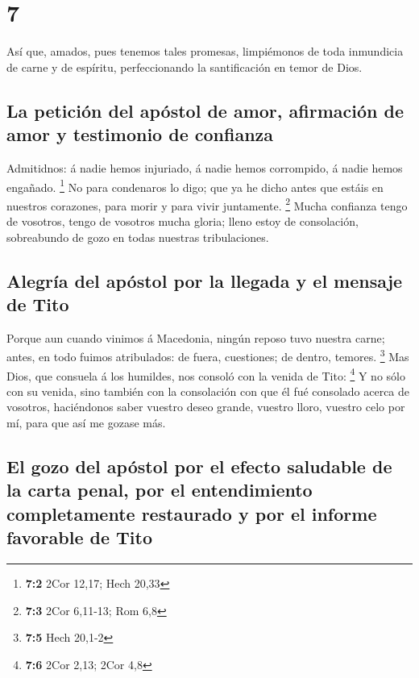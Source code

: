 \hypertarget{section-6}{%
\section{7}\label{section-6}}

 Así que, amados, pues tenemos tales promesas, limpiémonos
de toda inmundicia de carne y de espíritu, perfeccionando la
santificación en temor de Dios.

\hypertarget{la-peticiuxf3n-del-apuxf3stol-de-amor-afirmaciuxf3n-de-amor-y-testimonio-de-confianza}{%
\subsection{La petición del apóstol de amor, afirmación de amor y
testimonio de
confianza}\label{la-peticiuxf3n-del-apuxf3stol-de-amor-afirmaciuxf3n-de-amor-y-testimonio-de-confianza}}

 Admitidnos: á nadie hemos injuriado, á nadie hemos
corrompido, á nadie hemos engañado. \footnote{\textbf{7:2} 2Cor 12,17;
  Hech 20,33}  No para condenaros lo digo; que ya he dicho
antes que estáis en nuestros corazones, para morir y para vivir
juntamente. \footnote{\textbf{7:3} 2Cor 6,11-13; Rom 6,8} 
Mucha confianza tengo de vosotros, tengo de vosotros mucha gloria; lleno
estoy de consolación, sobreabundo de gozo en todas nuestras
tribulaciones.

\hypertarget{alegruxeda-del-apuxf3stol-por-la-llegada-y-el-mensaje-de-tito}{%
\subsection{Alegría del apóstol por la llegada y el mensaje de
Tito}\label{alegruxeda-del-apuxf3stol-por-la-llegada-y-el-mensaje-de-tito}}

 Porque aun cuando vinimos á Macedonia, ningún reposo tuvo
nuestra carne; antes, en todo fuimos atribulados: de fuera, cuestiones;
de dentro, temores. \footnote{\textbf{7:5} Hech 20,1-2}  Mas
Dios, que consuela á los humildes, nos consoló con la venida de Tito:
\footnote{\textbf{7:6} 2Cor 2,13; 2Cor 4,8}  Y no sólo con
su venida, sino también con la consolación con que él fué consolado
acerca de vosotros, haciéndonos saber vuestro deseo grande, vuestro
lloro, vuestro celo por mí, para que así me gozase más.

\hypertarget{el-gozo-del-apuxf3stol-por-el-efecto-saludable-de-la-carta-penal-por-el-entendimiento-completamente-restaurado-y-por-el-informe-favorable-de-tito}{%
\subsection{El gozo del apóstol por el efecto saludable de la carta
penal, por el entendimiento completamente restaurado y por el informe
favorable de
Tito}\label{el-gozo-del-apuxf3stol-por-el-efecto-saludable-de-la-carta-penal-por-el-entendimiento-completamente-restaurado-y-por-el-informe-favorable-de-tito}}

